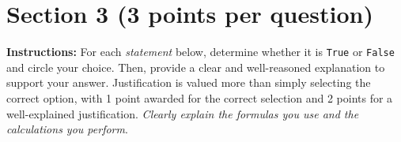 \documentclass{article}
\newcommand{\blankbox}[2][3cm]{%
    \vspace{-0.5em}
    \begin{figure}[H]
        \makebox[\linewidth]{%
            \begin{tcolorbox}[
                colback=white, 
                colframe=black, 
                width=#2, %
                height=#1,
                boxrule=0.2mm
            ]
            \end{tcolorbox}
        }
    \end{figure}
    \vspace{-2em}
}
\begin{document}
\begin{comment}
\item  \underline{Question 2.5}: According to the sample data, what is the probability that a student’s political-news consumption is greater than or equal to 0.90 standard deviations above the sample mean? \emph{Justify your answer}. (\emph{Hint: Use the Z-score transformation equation to find the implicit value for $x$ when $Z=0.90$, given $\bar{x}$ and $s$)}
\blankbox[4cm]{1.06\textwidth}
\end{comment}

\newpage
\section*{Section 3 (3 points per question)}

\noindent\textbf{Instructions:}  
For each \emph{statement} below, determine whether it is \texttt{True} or \texttt{False} and circle your choice. Then, provide a clear and well-reasoned explanation to support your answer. Justification is valued more than simply selecting the correct option, with 1 point awarded for the correct selection and 2 points for a well-explained justification. \emph{Clearly explain the formulas you use and the calculations you perform}.
\end{document}
